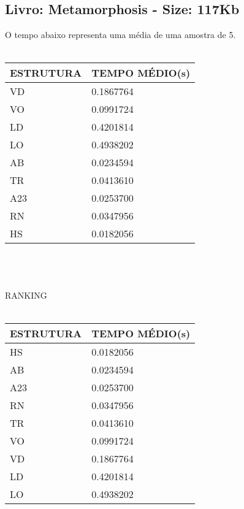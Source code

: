 \documentclass[14pt]{article}
\begin{document}
{\subsection{Livro: Metamorphosis - Size: 117Kb}
O tempo abaixo representa uma média de uma amostra de 5.\\\\   
\begin{tabular}{ |p{3.1cm}||p{4.1cm}|}
    \hline
    ESTRUTURA & TEMPO MÉDIO(s)\\
    \hline
    VD & 0.1867764 \\
    VO & 0.0991724 \\
    LD & 0.4201814 \\
    LO & 0.4938202 \\
    AB & 0.0234594 \\
    TR & 0.0413610 \\
    A23 & 0.0253700 \\
    RN & 0.0347956 \\
    HS & 0.0182056 \\
    \hline
\end{tabular}
\\\\\\
RANKING\\\\
\begin{tabular}{ |p{3.1cm}||p{4.1cm}|}
    \hline
    ESTRUTURA & TEMPO MÉDIO(s)\\
    \hline
    HS & 0.0182056 \\
    AB & 0.0234594 \\
    A23 & 0.0253700 \\
    RN & 0.0347956 \\
    TR & 0.0413610 \\
    VO & 0.0991724 \\
    VD & 0.1867764 \\
    LD & 0.4201814 \\
    LO & 0.4938202 \\
    \hline
\end{tabular}\\\\

\newpage

}
\end{document}
